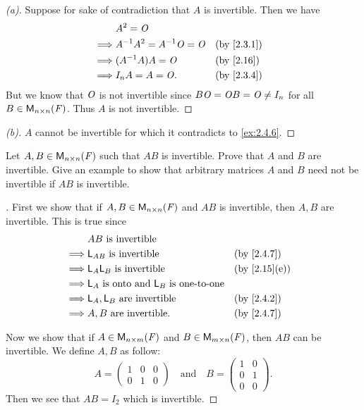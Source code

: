 \begin{proof}[(a)]
	Suppose for sake of contradiction that \(A\) is invertible.
	Then we have
	\begin{align*}
		         & A^2 = \zm                                     \\
		\implies & A^{-1} A^2 = A^{-1} \zm = \zm &  & \by{2.3.1} \\
		\implies & (A^{-1} A) A = \zm            &  & \by{2.16}  \\
		\implies & I_n A = A = \zm.              &  & \by{2.3.4}
	\end{align*}
	But we know that \(\mathit{O}\) is not invertible since \(B \mathit{O} = \mathit{O} B = \mathit{O} \neq I_n\) for all \(B \in \ms[n][n][\F]\).
	Thus \(A\) is not invertible.
\end{proof}

\begin{proof}[(b)]
	\(A\) cannot be invertible for which it contradicts to \cref{ex:2.4.6}.
\end{proof}

\setcounter{ex}{8}
\begin{ex}\label{ex:2.4.9}
	Let \(A, B \in \ms[n][n][\F]\) such that \(AB\) is invertible.
	Prove that \(A\) and \(B\) are invertible.
	Give an example to show that arbitrary matrices \(A\) and \(B\) need not be invertible if \(AB\) is invertible.
\end{ex}

\begin{proof}[]
	First we show that if \(A, B \in \ms[n][n][\F]\) and \(AB\) is invertible, then \(A, B\) are invertible.
	This is true since
	\begin{align*}
		         & AB \text{ is invertible}                                               \\
		\implies & \L_{AB} \text{ is invertible}                        &  & \by{2.4.7}   \\
		\implies & \L_A \L_B \text{ is invertible}                      &  & \by{2.15}[e] \\
		\implies & \L_A \text{ is onto and } \L_B \text{ is one-to-one}                   \\
		\implies & \L_A, \L_B \text{ are invertible}                    &  & \by{2.4.2}   \\
		\implies & A, B \text{ are invertible}.                         &  & \by{2.4.7}
	\end{align*}

	Now we show that if \(A \in \ms[n][m][\F]\) and \(B \in \ms\), then \(AB\) can be invertible.
	We define \(A, B\) as follow:
	\[
		A = \begin{pmatrix}
			1 & 0 & 0 \\
			0 & 1 & 0
		\end{pmatrix} \quad \text{and} \quad B = \begin{pmatrix}
			1 & 0 \\
			0 & 1 \\
			0 & 0
		\end{pmatrix}.
	\]
	Then we see that \(AB = I_2\) which is invertible.
\end{proof}

